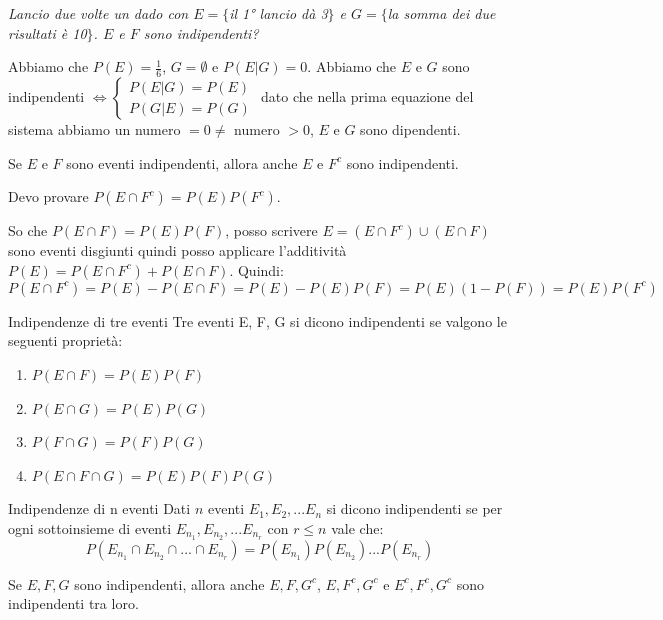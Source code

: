\begin{Example}{}{}
    \textit{Lancio due volte un dado con $E=\{$il 1° lancio dà 3$\}$ e $G=\{$la somma dei due risultati è 10$\}$. $E$ e $F$ sono indipendenti?}

    Abbiamo che $P(E)=\frac{1}{6}$, $G=\emptyset$ e $P(E|G)=0$. Abbiamo che $E$ e $G$ sono indipendenti $\iff\begin{cases}
        P(E|G)=P(E)\\P(G|E)=P(G)
    \end{cases}$ dato che nella prima equazione del sistema abbiamo un numero $=0\neq$ numero $>0$, $E$ e $G$ sono dipendenti.
\end{Example}

\begin{Proposition}{}{}
    Se $E$ e $F$ sono eventi indipendenti, allora anche $E$ e $F^c$ sono indipendenti.
    \begin{demonstration}
        Devo provare $P(E\cap F^c)=P(E)P(F^c)$. 
        
        So che $P(E\cap F)=P(E)P(F)$, posso scrivere $E=(E\cap F^c)\cup(E\cap F)$ sono eventi disgiunti quindi posso applicare l'additività $P(E)=P(E\cap F^c)+P(E\cap F)$. Quindi:
        \begin{equation*}
            P(E\cap F^c)=P(E)-P(E\cap F)=P(E)-P(E)P(F)=P(E)(1-P(F))=P(E)P(F^c)    
        \end{equation*}
    \end{demonstration}
\end{Proposition}

\begin{Definition}{Indipendenze di tre eventi}{}
    Tre eventi E, F, G si dicono indipendenti se valgono le seguenti proprietà:
    \begin{enumerate}
        \item $P(E\cap F) = P(E)P(F)$
        \item $P(E\cap G) = P(E)P(G)$
        \item $P(F\cap G) = P(F)P(G)$
        \item $P(E\cap F\cap G) = P(E)P(F)P(G)$
    \end{enumerate}
\end{Definition}

\begin{Definition}{Indipendenze di n eventi}{}
    Dati $n$ eventi $E_1,E_2,...E_n$ si dicono indipendenti se per ogni sottoinsieme di eventi $E_{n_1},E_{n_2},...E_{n_r}$ con $r\leq n$ vale che:
    \begin{equation*}
        P(E_{n_1}\cap E_{n_2}\cap...\cap E_{n_r})=P(E_{n_1})P(E_{n_2})...P(E_{n_r})
    \end{equation*}
    \begin{proposition}
        Se $E,F,G$ sono indipendenti, allora anche $E,F,G^c$, $E,F^c,G^c$ e $E^c,F^c,G^c$ sono indipendenti tra loro.
    \end{proposition}
\end{Definition}

